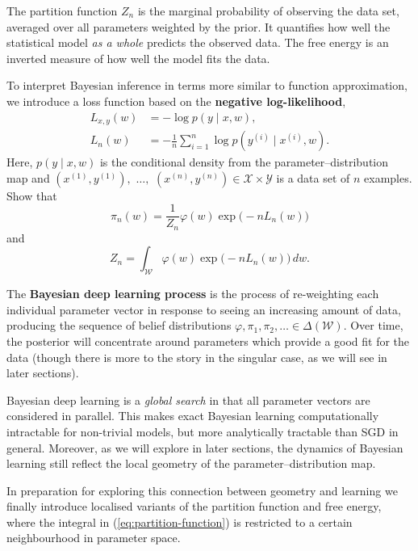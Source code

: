 \documentclass[11pt]{article}
\newcommand{\X}{\mathcal{X}}
\newcommand{\Y}{\mathcal{Y}}
\newcommand{\W}{\mathcal{W}}
\begin{document}
The partition function $Z_n$ is the marginal probability of observing the data
set, averaged over all parameters weighted by the prior. It quantifies how well
the statistical model \emph{as a whole} predicts the observed data. The free
energy is an inverted measure of how well the model fits the data.

\begin{exercise}
\label{ex:gibbs}
    To interpret Bayesian inference in terms more similar to function
    approximation, we introduce a loss function based on the
    \textbf{negative log-likelihood},
    \begin{align}
    \label{eq:nll-loss}
        L_{x,y}(w)
        &= -\log p(y \mid x, w),
    \\  L_n(w)
        &= -\frac{1}{n} \sum_{i=1}^{n} \log p(y^{(i)} \mid x^{(i)}, w).
    \end{align}
    Here, $p(y \mid x, w)$ is the conditional density from the
    parameter--distribution map and 
        $(x^{(1)}, y^{(1)}),$ $\ldots,$ $(x^{(n)}, y^{(n)}) \in \X \times \Y$
    is a data set of $n$ examples.
    Show that
    $$
        \pi_n(w)
        = \frac{1}{Z_n} \varphi(w) \exp\!\big({-}n L_n(w)\big)
    $$
    and
    $$
        Z_n
        = \int_{\W} \varphi(w) \exp\!\big({-}n L_n(w)\big)\, dw.
    $$
\end{exercise}

The \textbf{Bayesian deep learning process} is the process of re-weighting each
individual parameter vector in response to seeing an increasing amount of data,
producing the sequence of belief distributions
    $\varphi, \pi_1, \pi_2, \ldots \in \Delta(\W)$.
Over time, the posterior will concentrate around parameters which provide a good
fit for the data (though there is more to the story in the singular case, as we
will see in later sections).

Bayesian deep learning is a \emph{global search} in that all parameter vectors are
considered in parallel. This makes exact Bayesian learning computationally
intractable for non-trivial models, but more analytically tractable than SGD in
general. Moreover, as we will explore in later sections, the dynamics of Bayesian
learning still reflect the local geometry of the parameter--distribution map.

In preparation for exploring this connection between geometry and learning we
finally introduce localised variants of the partition function and free energy,
where the integral in (\ref{eq:partition-function}) is restricted to a certain
neighbourhood in parameter space.
\end{document}
